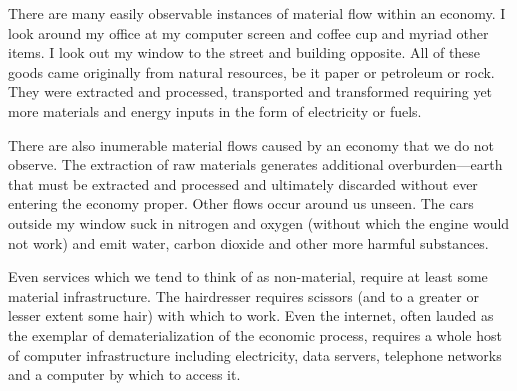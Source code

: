  

There are many easily observable instances of material flow within an
economy. I look around my office at my computer screen and coffee cup
and myriad other items. I look out my window to the street and building
opposite. All of these goods came originally from natural resources, be it paper or
petroleum or rock. They were extracted and processed, transported and
transformed requiring yet more materials and energy inputs in the form of
electricity or fuels. 

There are also inumerable material flows caused by an economy that we do not observe.
The extraction of raw materials generates additional overburden---earth that must be
extracted and processed and ultimately discarded without ever entering the economy
proper. Other flows occur around us unseen. The cars outside my window suck in nitrogen
and oxygen (without which the engine would not work) and emit water, carbon dioxide and
other more harmful substances. 

Even services which we tend to think of as non-material, require at least some material
infrastructure. The hairdresser requires scissors (and to a greater or lesser extent 
some hair) with which to work. Even the internet, often lauded as the exemplar of
dematerialization of the economic process, requires a whole host of computer
infrastructure including electricity, data servers, telephone networks and a
computer by which to access it.

